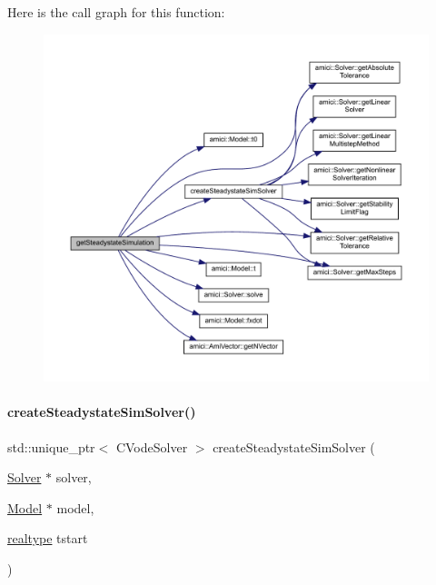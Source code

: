 Here is the call graph for this function\+:
\nopagebreak
\begin{figure}[H]
\begin{center}
\leavevmode
\includegraphics[width=350pt]{classamici_1_1_steadystate_problem_a7567ea97f4d840e7df61340b5129f4cd_cgraph}
\end{center}
\end{figure}
\mbox{\label{classamici_1_1_steadystate_problem_ad219bc64b739a9ff5d52555b0433577b}} 
\paragraph{\texorpdfstring{create\+Steadystate\+Sim\+Solver()}{createSteadystateSimSolver()}}
{\footnotesize\ttfamily std\+::unique\+\_\+ptr$<$ C\+Vode\+Solver $>$ create\+Steadystate\+Sim\+Solver (\begin{DoxyParamCaption}\item[{\mbox{\hyperlink{classamici_1_1_solver}{Solver}} $\ast$}]{solver,  }\item[{\mbox{\hyperlink{classamici_1_1_model}{Model}} $\ast$}]{model,  }\item[{\mbox{\hyperlink{namespaceamici_a1bdce28051d6a53868f7ccbf5f2c14a3}{realtype}}}]{tstart }\end{DoxyParamCaption})}

